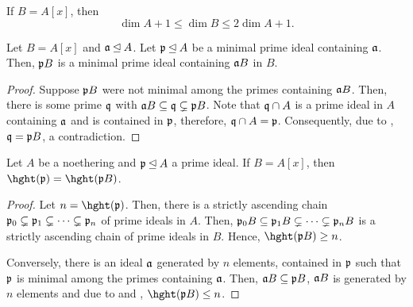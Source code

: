\begin{theorem}
    If $B = A[x]$, then 
    \begin{equation*}
        \dim A + 1\le \dim B\le 2\dim A + 1.
    \end{equation*}
\end{theorem}

\begin{lemma}
    Let $B = A[x]$ and $\mathfrak a\unlhd A$. Let $\mathfrak p\unlhd A$ be a minimal prime ideal containing $\mathfrak a$. Then, $\mathfrak p B$ is a minimal prime ideal containing $\mathfrak a B$ in $B$.
\end{lemma}
\begin{proof}
    Suppose $\mathfrak p B$ were not minimal among the primes containing $\mathfrak a B$. Then, there is some prime $\mathfrak q$ with $\mathfrak a B\subseteq\mathfrak q\subsetneq\mathfrak p B$. Note that $\mathfrak q\cap A$ is a prime ideal in $A$ containing $\mathfrak a$ and is contained in $\mathfrak p$, therefore, $\mathfrak q\cap A = \mathfrak p$. Consequently, due to , $\mathfrak q = \mathfrak p B$, a contradiction.
\end{proof}

\begin{proposition}
    Let $A$ be a noethering and $\mathfrak p\unlhd A$ a prime ideal. If $B = A[x]$, then $\hght(\frakp) = \hght(\frakp B)$.
\end{proposition}
\begin{proof}
    Let $n = \hght(\frakp)$. Then, there is a strictly ascending chain $\mathfrak p_0\subsetneq\mathfrak p_1\subsetneq\dots\subsetneq\mathfrak p_n$ of prime ideals in $A$. Then, $\mathfrak p_0 B\subseteq\mathfrak p_1B\subsetneq\dots\subsetneq\mathfrak p_nB$ is a strictly ascending chain of prime ideals in $B$. Hence, $\hght(\frakp B)\ge n$.

    Conversely, there is an ideal $\mathfrak a$ generated by $n$ elements, contained in $\mathfrak p$ such that $\mathfrak p$ is minimal among the primes containing $\mathfrak a$. Then, $\mathfrak a B\subseteq\mathfrak p B$, $\mathfrak a B$ is generated by $n$ elements and due to  and , $\hght(\frakp B)\le n$.
\end{proof}

